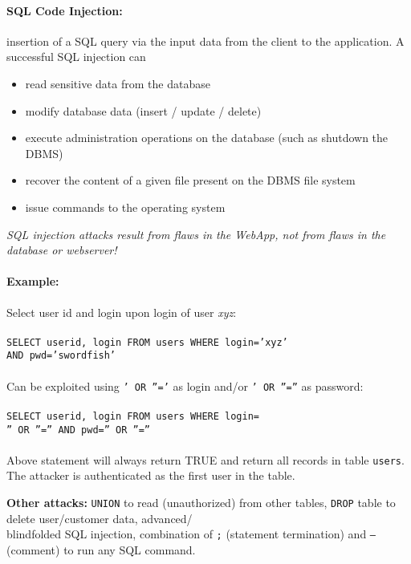 \paragraph{SQL Code Injection:} insertion of a SQL query via the input data from the client to the application. A successful SQL injection can
\begin{itemize}
\item read sensitive data from the database
\item modify database data (insert / update / delete)
\item execute administration operations on the database
(such as shutdown the DBMS)
\item recover the content of a given file present on the DBMS file
system
\item issue commands to the operating system
\end{itemize}
\emph{SQL injection attacks result from flaws in the WebApp, not from flaws in the database or webserver!}

\paragraph{Example:} Select user id and login upon login of user \emph{xyz}: \\
\\
{\tt SELECT userid, login FROM users WHERE login='xyz'}\\ {\tt AND pwd='swordfish'} \\
\\
Can be exploited using {\tt ' OR ''='} as login and/or {\tt ' OR ''=''} as password:\\
\\
{\tt SELECT userid, login FROM users WHERE login=} \\ {\tt '' OR ''='' AND pwd='' OR ''=''} \\
\\
Above statement will always return TRUE and return all records in table {\tt users}. The attacker is authenticated as the first user in the table.

\textbf{Other attacks:} {\tt UNION} to read (unauthorized) from other tables, {\tt DROP} table to delete user/customer data, advanced/\\blindfolded SQL injection, combination of {\tt ;} (statement termination) and {\tt --} (comment) to run any SQL command.

